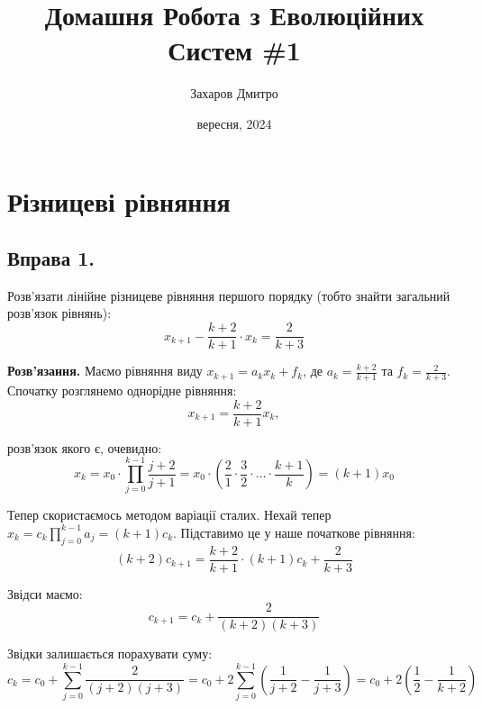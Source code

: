 \documentclass{hw_template}
\title{\huge\sffamily\bfseries Домашня Робота з Еволюційних Систем \#1}
\author{\Large\sffamily Захаров Дмитро}
\date{\sffamily 8 вересня, 2024}
\begin{document}
\pagestyle{fancy}

\maketitle

\tableofcontents

\pagebreak

\section{Різницеві рівняння}

\subsection{Вправа 1.}
\begin{problem}
    Розв'язати лінійне різницеве рівняння першого порядку (тобто знайти загальний розв'язок рівнянь):
    \begin{equation*}
        x_{k+1} - \frac{k+2}{k+1}\cdot x_k = \frac{2}{k+3}
    \end{equation*}
\end{problem}

\textbf{Розв'язання.} Маємо рівняння виду $x_{k+1} = a_k x_k + f_k$, де $a_k = \frac{k+2}{k+1}$ та $f_k = \frac{2}{k+3}$. Спочатку розглянемо однорідне рівняння:
\begin{equation*}
    x_{k+1} = \frac{k+2}{k+1}x_k,
\end{equation*}

розв'язок якого є, очевидно:
\begin{equation*}
    x_k = x_0 \cdot \prod_{j=0}^{k-1} \frac{j+2}{j+1} = x_0 \cdot \left(\frac{2}{1} \cdot \frac{3}{2} \cdot \ldots \cdot \frac{k+1}{k}\right) = (k+1)x_0
\end{equation*}

Тепер скористаємось методом варіації сталих. Нехай тепер $x_k = c_k\prod_{j=0}^{k-1}a_j = (k+1)c_k$. Підставимо це у наше початкове рівняння:
\begin{equation*}
    (k+2)c_{k+1} = \frac{k+2}{k+1} \cdot (k+1)c_k + \frac{2}{k+3}
\end{equation*}

Звідси маємо:
\begin{equation*}
    c_{k+1} = c_k + \frac{2}{(k+2)(k+3)}
\end{equation*}

Звідки залишається порахувати суму:
\begin{equation*}
    c_k = c_0 + \sum_{j=0}^{k-1} \frac{2}{(j+2)(j+3)} = c_0 + 2\sum_{j=0}^{k-1} \left(\frac{1}{j+2} - \frac{1}{j+3}\right) = c_0 + 2\left(\frac{1}{2} - \frac{1}{k+2}\right)
\end{equation*}
\end{document}
